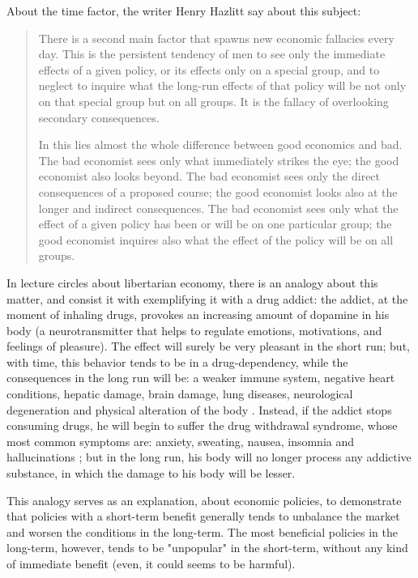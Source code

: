 \documentclass[12pt,a4paper,twoside]{book}
\begin{document}
About the time factor, the writer Henry Hazlitt say about this subject:

\begin{quotation}
There is a second main factor that spawns new economic fallacies every day. This is the persistent tendency of men to see only the immediate effects of a given policy, or its effects only on a special group, and to neglect to inquire what the long-run effects of that policy will be not only on that special group but on all groups. It is the fallacy of overlooking secondary consequences.

In this lies almost the whole difference between good economics and bad. The bad economist sees only what immediately strikes the eye; the good economist also looks beyond. The bad economist sees only the direct consequences of a proposed course; the good economist looks also at the longer and indirect consequences. The bad economist sees only what the effect of a given policy has been or will be on one particular group; the good economist inquires also what the effect of the policy will be on all groups. \cite[pp. 3-4]{hazlitt:econo1lec}
\end{quotation}

In lecture circles about libertarian economy, there is an analogy about this matter, and consist it with exemplifying it with a drug addict: the addict, at the moment of inhaling drugs, provokes an increasing amount of dopamine in his body (a neurotransmitter that helps to regulate emotions, motivations, and feelings of pleasure). The effect will surely be very pleasant in the short run; but, with time, this behavior tends to be in a drug-dependency, while the consequences in the long run will be: a weaker immune system, negative heart conditions, hepatic damage, brain damage, lung diseases, neurological degeneration and physical alteration of the body \cite{drug-problems}. Instead, if the addict stops consuming drugs, he will begin to suffer the drug withdrawal syndrome, whose most common symptoms are: anxiety, sweating, nausea, insomnia and hallucinations \cite{whitdrawal}; but in the long run, his body will no longer process any addictive substance, in which the damage to his body will be lesser.

This analogy serves as an explanation, about economic policies, to demonstrate that policies with a short-term benefit generally tends to unbalance the market and worsen the conditions in the long-term. The most beneficial policies in the long-term, however, tends to be "unpopular" in the short-term, without any kind of immediate benefit (even, it could seems to be harmful).
\end{document}

